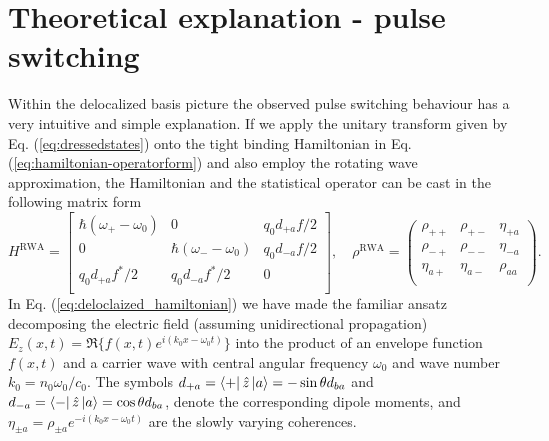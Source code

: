 \documentclass[]{spie}  %
\begin{document}
\section{Theoretical explanation - pulse switching}
\label{sec:theoretical-explaination-pulse-switching}
Within the delocalized basis picture the observed pulse switching behaviour has a very intuitive and simple explanation. If we apply the unitary transform given by Eq. (\ref{eq:dressedstates}) onto the tight binding Hamiltonian in Eq. (\ref{eq:hamiltonian-operatorform}) and also employ the rotating wave approximation, the Hamiltonian and the statistical operator can be cast in the following matrix form
\begin{equation}
H^{\text{RWA}} = \begin{bmatrix}
\hbar (\omega_+-\omega_0) & 0 & q_0d_{+a}f/2 \\
0 & \hbar (\omega_--\omega_0) & q_0d_{-a}f/2 \\
q_0d_{+a}f^*/2 & q_0d_{-a}f^*/2 & 0 \\
\end{bmatrix},\quad \rho^{\text{RWA}} = \begin{pmatrix}
\rho_{++} & \rho_{+-} & \eta_{+a} \\ 
\rho_{-+} & \rho_{--} & \eta_{-a} \\ 
\eta_{a+} & \eta_{a-} & \rho_{aa} \\ 
\end{pmatrix}. \label{eq:deloclaized_hamiltonian}
\end{equation}
In Eq. (\ref{eq:deloclaized_hamiltonian}) we have made the familiar ansatz decomposing the electric field (assuming unidirectional propagation) $E_z(x,t) = \Re\{f(x,t) e^{i(k_0x-\omega_0 t)}\}$ into the product of an envelope function $f(x,t)$ and a carrier wave with central angular frequency $\omega_0$ and wave number $k_0 = n_0\omega_0/c_0$. The symbols $d_{+a} = \Bra{+}\hat{z}\Ket{a} = -\sin\theta d_{ba}  $ and $d_{-a} = \Bra{-}\hat{z}\Ket{a} = \cos\theta d_{ba}$, denote the corresponding dipole moments, and $ \eta_{\pm a} = \rho_{\pm a}e^{-i(k_0x-\omega_0 t)}$ are the slowly varying coherences. 
\end{document}
